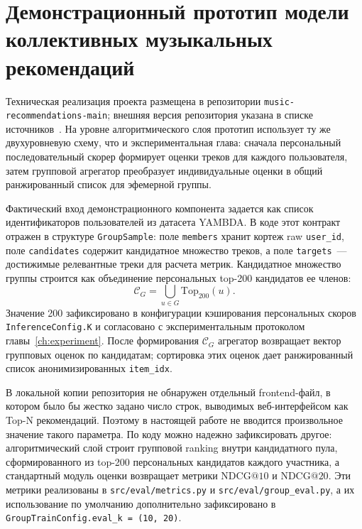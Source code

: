 \section{Демонстрационный прототип модели коллективных музыкальных рекомендаций}
\label{sec:ch6:model-demo}

Техническая реализация проекта размещена в репозитории \texttt{music-recommendations-main}; внешняя версия репозитория указана в списке источников~\cite{music_recommendations_github}. На уровне алгоритмического слоя прототип использует ту же двухуровневую схему, что и экспериментальная глава: сначала персональный последовательный скорер формирует оценки треков для каждого пользователя, затем групповой агрегатор преобразует индивидуальные оценки в общий ранжированный список для эфемерной группы.

Фактический вход демонстрационного компонента задается как список идентификаторов пользователей из датасета YAMBDA. В коде этот контракт отражен в структуре \texttt{GroupSample}: поле \texttt{members} хранит кортеж raw \texttt{user\_id}, поле \texttt{candidates} содержит кандидатное множество треков, а поле \texttt{targets}~--- достижимые релевантные треки для расчета метрик. Кандидатное множество группы строится как объединение персональных top-200 кандидатов ее членов:
\begin{equation*}
    \mathcal{C}_G = \bigcup_{u \in G} \mathrm{Top}_{200}(u).
\end{equation*}
Значение 200 зафиксировано в конфигурации кэширования персональных скоров \texttt{InferenceConfig.K} и согласовано с экспериментальным протоколом главы~\ref{ch:experiment}. После формирования $\mathcal{C}_G$ агрегатор возвращает вектор групповых оценок по кандидатам; сортировка этих оценок дает ранжированный список анонимизированных \texttt{item\_idx}.

В локальной копии репозитория не обнаружен отдельный frontend-файл, в котором было бы жестко задано число строк, выводимых веб-интерфейсом как Top-N рекомендаций. Поэтому в настоящей работе не вводится произвольное значение такого параметра. По коду можно надежно зафиксировать другое: алгоритмический слой строит групповой ranking внутри кандидатного пула, сформированного из top-200 персональных кандидатов каждого участника, а стандартный модуль оценки возвращает метрики $\mathrm{NDCG@10}$ и $\mathrm{NDCG@20}$. Эти метрики реализованы в \texttt{src/eval/metrics.py} и \texttt{src/eval/group\_eval.py}, а их использование по умолчанию дополнительно зафиксировано в \texttt{GroupTrainConfig.eval\_k = (10, 20)}.

